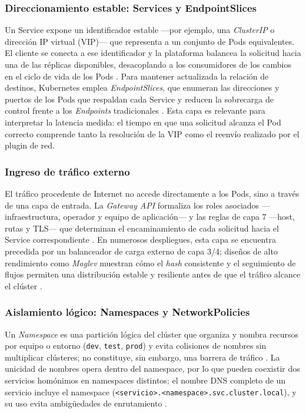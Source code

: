 \subsubsection{Direccionamiento estable: Services y EndpointSlices}

Un Service expone un identificador estable ---por ejemplo, una \emph{ClusterIP} o dirección IP virtual (VIP)--- que representa a un conjunto de Pods equivalentes. El cliente se conecta a ese identificador y la plataforma balancea la solicitud hacia una de las réplicas disponibles, desacoplando a los consumidores de los cambios en el ciclo de vida de los Pods \cite{ref3,ref13}. Para mantener actualizada la relación de destinos, Kubernetes emplea \emph{EndpointSlices}, que enumeran las direcciones y puertos de los Pods que respaldan cada Service y reducen la sobrecarga de control frente a los \emph{Endpoints} tradicionales \cite{ref1}. Esta capa es relevante para interpretar la latencia medida: el tiempo en que una solicitud alcanza el Pod correcto comprende tanto la resolución de la VIP como el reenvío realizado por el plugin de red.

\subsubsection{Ingreso de tráfico externo}

El tráfico procedente de Internet no accede directamente a los Pods, sino a través de una capa de entrada. La \emph{Gateway API} formaliza los roles asociados ---infraestructura, operador y equipo de aplicación--- y las reglas de capa 7 ---host, rutas y TLS--- que determinan el encaminamiento de cada solicitud hacia el Service correspondiente \cite{ref17}. En numerosos despliegues, esta capa se encuentra precedida por un balanceador de carga externo de capa 3/4; diseños de alto rendimiento como \emph{Maglev} muestran cómo el \emph{hash} consistente y el seguimiento de flujos permiten una distribución estable y resiliente antes de que el tráfico alcance el clúster \cite{ref5}.

\subsubsection{Aislamiento lógico: Namespaces y NetworkPolicies}

Un \emph{Namespace} es una partición lógica del clúster que organiza y nombra recursos por equipo o entorno (\texttt{dev}, \texttt{test}, \texttt{prod}) y evita colisiones de nombres sin multiplicar clústeres; no constituye, sin embargo, una barrera de tráfico \cite{ref2}. La unicidad de nombres opera dentro del namespace, por lo que pueden coexistir dos servicios homónimos en namespaces distintos; el nombre DNS completo de un servicio incluye el namespace (\texttt{<servicio>.<namespace>.svc.cluster.local}), y su uso evita ambigüedades de enrutamiento \cite{ref13,ref2}.

